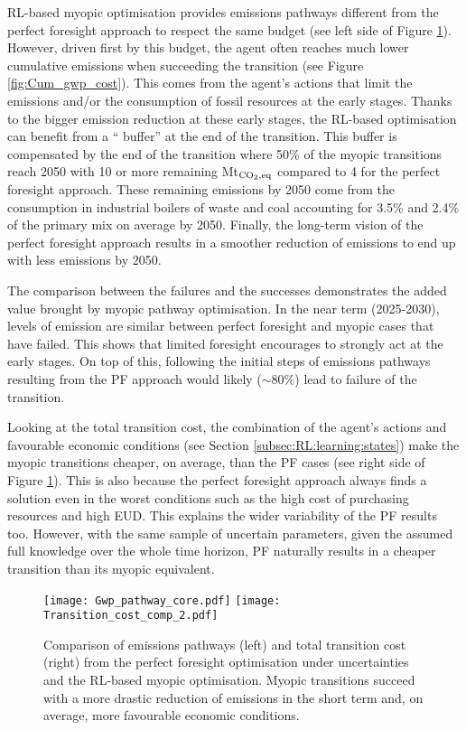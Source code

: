 \documentclass[12pt,letterpaper]{article}
\begin{document}
\gls*{RL}-based myopic optimisation provides  emissions pathways different from the perfect foresight approach to respect the same  budget (see left side of Figure \ref{fig:Gwp_pathway_total_tran_cost}). However, driven first by this  budget, the agent often reaches much lower cumulative emissions when succeeding the transition (see Figure \ref{fig:Cum_gwp_cost}). This comes from the agent's actions that limit the emissions and/or the consumption of fossil resources at the early stages. Thanks to the bigger emission reduction at these early stages, the \gls*{RL}-based optimisation can benefit from a `` buffer'' at the end of the transition. This buffer is compensated by the end of the transition where 50\% of the myopic transitions reach 2050 with 10 or more remaining Mt$_{\ce{CO2},\text{eq}}$ compared to 4 for the perfect foresight approach. These remaining emissions by 2050 come from the consumption in industrial boilers of waste and coal accounting for 3.5\% and 2.4\% of the primary mix on average by 2050. Finally, the long-term vision of the perfect foresight approach results in a smoother reduction of emissions to end up with less emissions by 2050.

The comparison between the failures and the successes demonstrates the added value brought by myopic pathway optimisation. In the near term (2025-2030), levels of emission are similar between perfect foresight and myopic cases that have failed. This shows that limited foresight encourages to strongly act at the early stages. On top of this, following the initial steps of  emissions pathways resulting from the PF approach would likely ($\sim$80\%) lead to failure of the transition. 

Looking at the total transition cost, the combination of the agent's actions and favourable economic conditions (see Section \ref{subsec:RL:learning:states}) make the myopic transitions cheaper, on average, than the PF cases (see right side of Figure \ref{fig:Gwp_pathway_total_tran_cost}). This is also because the perfect foresight approach always finds a solution even in the worst conditions such as the high cost of purchasing resources and high \gls*{EUD}. This explains the wider variability of the PF results too. However, with the same sample of uncertain parameters, given the assumed full knowledge over the whole time horizon, PF naturally results in a cheaper transition than its myopic equivalent.

\begin{figure}[!htbp]
\centering
\texttt{[image: Gwp\_pathway\_core.pdf]}
\texttt{[image: Transition\_cost\_comp\_2.pdf]}
\caption{Comparison of  emissions pathways (left) and total transition cost (right) from the perfect foresight optimisation under uncertainties and the \gls*{RL}-based myopic optimisation. Myopic transitions succeed with a more drastic reduction of emissions in the short term and, on average, more favourable economic conditions.}
\label{fig:Gwp_pathway_total_tran_cost}
\end{figure}
\end{document}
